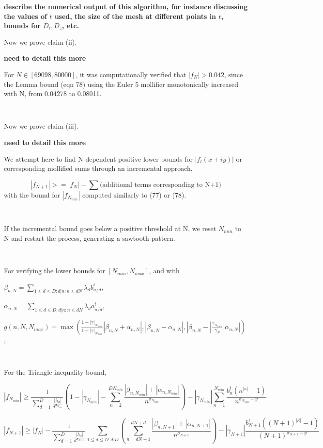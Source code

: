 {\bf describe the numerical output of this algorithm, for instance discussing the values of $t$ used, the size of the mesh at different points in $t$, bounds for $D_t, D_z$, etc.}


Now we prove claim (ii).

{\bf need to detail this more}

For $N \in [69098,80000]$, it was computationally verified that $|f_{N}| > 0.042$, since the Lemma bound (eqn 78) using the Euler 5 mollifier monotonically increased with N, from 0.04278 to 0.08011.

$ $
 

Now we prove claim (iii).

{\bf need to detail this more}

We attempt here to find N dependent positive lower bounds for $|f_{t}(x+iy)|$ or corresponding mollified sums through an incremental approach,

$$ |f_{N+1}| >= |f_{N}| - \sum \textrm{(additional terms corresponding to N+1)}$$
with the bound for $|f_{N_{min}}|$ computed similarly to (77) or (78).

$ $

If the incremental bound goes below a positive threshold at N, we reset $N_{min}$ to N and restart the process, generating a sawtooth pattern.

$ $

For verifying the lower bounds for $[N_{min},N_{max}]$, and with

$\beta_{n,N} = \sum\limits_{1 \leq d \leq D:d|n:n \leq dN} \lambda_{d} b_{n/d}^{t}$, 

$\alpha_{n,N} = \sum\limits_{1 \leq d \leq D:d|n:n \leq dN} \lambda_{d} a_{n/d}^{t}$,

$g(n,N,N_{max}) = \max(\frac{1-|\gamma|_{N_{max}}}{1+|\gamma|_{N_{max}}} |\beta_{n,N} + \alpha_{n,N}|, |\beta_{n,N} - \alpha_{n,N}|,  |\beta_{n,N} - |\frac{\gamma_{N_{max}}}{\gamma_{N}}| \alpha_{n,N}|)$,

$ $

For the Triangle inequality bound,

$$|f_{N_{min}}| \geq \frac{1}{\sum_{d=1}^D \frac{|\lambda_d|}{d^{\sigma_{N_{min}}}}} (1 - |\gamma_{N_{min}}| - \sum\limits_{n=2}^{DN_{min}} \frac{|\beta_{n,N_{min}}| + |\alpha_{n,N_{min}}|}{n^{\sigma_{N_{min}}}}) - |\gamma_{N_{min}}| \sum_{n=1}^{N_{min}} \frac{b_n^t (n^{|\kappa|} - 1)}{n^{\sigma_{N_{min}}-y}}$$


$$|f_{N+1}| \geq |f_{N}| - \frac{1}{\sum_{d=1}^D \frac{|\lambda_d|}{d^{\sigma_{N+1}}}} \sum\limits_{1 \leq d \leq D:d|D}(\sum\limits_{n=dN+1}^{dN+d} \frac{|\beta_{n,N+1}| + |\alpha_{n,N+1}|}{n^{\sigma_{N+1}}}) - |\gamma_{N+1}| \frac{b_{N+1}^t ({(N+1)}^{|\kappa|} - 1)}{(N+1)^{\sigma_{N+1}-y}}$$

